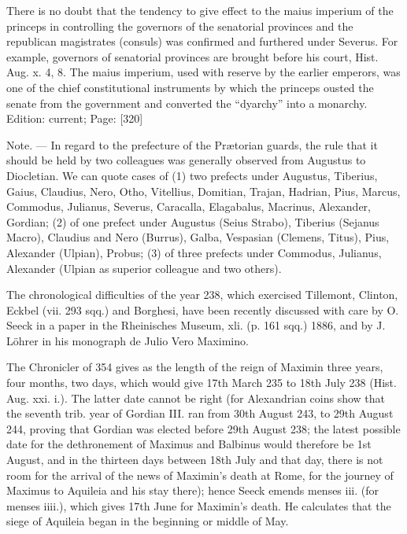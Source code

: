 There is no doubt that the tendency to give effect to the maius imperium of the princeps in controlling the governors of the senatorial provinces and the republican magistrates (consuls) was confirmed and furthered under Severus. For example, governors of senatorial provinces are brought before his court, Hist. Aug. x. 4, 8. The maius imperium, used with reserve by the earlier emperors, was one of the chief constitutional instruments by which the princeps ousted the senate from the government and converted the \texthebrew{“}dyarchy\texthebrew{}” into a monarchy.
Edition: current; Page: [320]

Note. \texthebrew{—} In regard to the prefecture of the Prætorian guards, the rule that it should be held by two colleagues was generally observed from Augustus to Diocletian. We can quote cases of (1) two prefects under Augustus, Tiberius, Gaius, Claudius, Nero, Otho, Vitellius, Domitian, Trajan, Hadrian, Pius, Marcus, Commodus, Julianus, Severus, Caracalla, Elagabalus, Macrinus, Alexander, Gordian; (2) of one prefect under Augustus (Seius Strabo), Tiberius (Sejanus Macro), Claudius and Nero (Burrus), Galba, Vespasian (Clemens, Titus), Pius, Alexander (Ulpian), Probus; (3) of three prefects under Commodus, Julianus, Alexander (Ulpian as superior colleague and two others).


The chronological difficulties of the year 238, which exercised Tillemont, Clinton, Eckbel (vii. 293 sqq.) and Borghesi, have been recently discussed with care by O. Seeck in a paper in the Rheinisches Museum, xli. (p. 161 sqq.) 1886, and by J. Löhrer in his monograph de Julio Vero Maximino.

The Chronicler of 354 gives as the length of the reign of Maximin three years, four months, two days, which would give 17th March 235 to 18th July 238 (Hist. Aug. xxi. i.). The latter date cannot be right (for Alexandrian coins show that the seventh trib. year of Gordian III. ran from 30th August 243, to 29th August 244, proving that Gordian was elected before 29th August 238; the latest possible date for the dethronement of Maximus and Balbinus would therefore be 1st August, and in the thirteen days between 18th July and that day, there is not room for the arrival of the news of Maximin\texthebrew{}’s death at Rome, for the journey of Maximus to Aquileia and his stay there); hence Seeck emends menses iii. (for menses iiii.), which gives 17th June for Maximin\texthebrew{}’s death. He calculates that the siege of Aquileia began in the beginning or middle of May.

